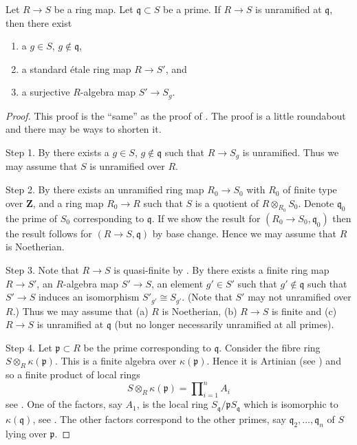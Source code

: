 \begin{proposition}
\label{proposition-unramified-locally-standard}
Let $R \to S$ be a ring map. Let $\mathfrak q \subset S$ be a prime.
If $R \to S$ is unramified at $\mathfrak q$, then there exist
\begin{enumerate}
\item a $g \in S$, $g \not \in \mathfrak q$,
\item a standard \'etale ring map $R \to S'$, and
\item a surjective $R$-algebra map $S' \to S_g$.
\end{enumerate}
\end{proposition}

\begin{proof}
This proof is the ``same'' as the proof of
.
The proof is a little roundabout and there may be ways to
shorten it.

\medskip\noindent
Step 1. By 
there exists a $g \in S$, $g \not \in \mathfrak q$
such that $R \to S_g$ is unramified. Thus we may assume that $S$ is
unramified over $R$.

\medskip\noindent
Step 2. By 
there exists an unramified ring map $R_0 \to S_0$
with $R_0$ of finite type over $\mathbf{Z}$, and a ring map
$R_0 \to R$ such that $S$ is a quotient of $R \otimes_{R_0} S_0$. Denote
$\mathfrak q_0$ the prime of $S_0$ corresponding to $\mathfrak q$.
If we show the result for $(R_0 \to S_0, \mathfrak q_0)$ then the
result follows for $(R \to S, \mathfrak q)$ by base change. Hence
we may assume that $R$ is Noetherian.

\medskip\noindent
Step 3.
Note that $R \to S$ is quasi-finite by
.
By 
there exists a finite ring map $R \to S'$, an $R$-algebra map
$S' \to S$, an element $g' \in S'$ such that
$g' \not \in \mathfrak q$ such that $S' \to S$ induces
an isomorphism $S'_{g'} \cong S_{g'}$.
(Note that $S'$ may not unramified over $R$.)
Thus we may assume that (a) $R$ is Noetherian, (b) $R \to S$ is finite
and (c) $R \to S$ is unramified at $\mathfrak q$
(but no longer necessarily unramified at all primes).

\medskip\noindent
Step 4. Let $\mathfrak p \subset R$ be the prime corresponding
to $\mathfrak q$. Consider the fibre ring
$S \otimes_R \kappa(\mathfrak p)$. This is a finite algebra over
$\kappa(\mathfrak p)$. Hence it is Artinian
(see ) and
so a finite product of local rings
$$
S \otimes_R \kappa(\mathfrak p) = \prod\nolimits_{i = 1}^n A_i
$$
see . One of the factors,
say $A_1$, is the local ring $S_{\mathfrak q}/\mathfrak pS_{\mathfrak q}$
which is isomorphic to $\kappa(\mathfrak q)$,
see . The other factors correspond to
the other primes, say $\mathfrak q_2, \ldots, \mathfrak q_n$ of
$S$ lying over $\mathfrak p$.


\end{proof}
